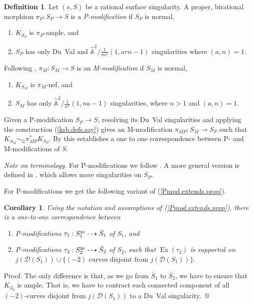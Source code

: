 \documentclass{amsart}
\newtheorem{cor}[thm]{Corollary}
\theoremstyle{definition}
\newtheorem{defn}[thm]{Definition}
\theoremstyle{remark}
\renewcommand{\a}[0]{\hat{\mathbb A}}
\newcommand{\q}[0]{{\mathbb Q}}
\newcommand{\map}[0]{\dasharrow}
\newcommand{\ex}[0]{\operatorname{Ex}}
\newcommand{\simq}[0]{\sim_{\q}}
\begin{document}
\begin{defn}\label{P+M.defn}
  Let $(s,S)$ be a rational surface singularity. A proper, birational morphism $\pi_P:S_P\to S$ is a {\it P-modification}
if $S_P$ is normal,
\begin{enumerate}
\item $K_{S_P}$ is $\pi_P$-ample, and
\item $S_P$ has only Du~Val and $\a^2/\tfrac1{rn^2}(1, arn{-}1)$ singularities where  $(a,n)=1$.
\end{enumerate}
Following  \cite{be-ch}, $\pi_M:S_M\to S$ is an
 {\it M-modification} if  $S_M$ is normal,
\begin{enumerate}
\item $K_{S_M}$ is $\pi_M$-nef, and
\item $S_M$ has only  $\a^2/\tfrac1{n^2}(1, na{-}1)$ singularities, where  $n>1$ and $(a,n)=1$.
\end{enumerate}
Given a P-modification  $S_P\to S$, resolving its Du~Val  singularities and applying the construction (\ref{ksb.defs.say}) 
gives an M-modification $\pi_{MP}:S_M\to S_P$ such that
$K_{S_M}\simq \pi_{MP}^*K_{S_P}$. By \cite{be-ch} this establishes a
one to one correspondence between P- and M-modifications of $S$.

{\it Note on terminology.} For P-modifications we follow \cite[3.8]{ksb}.
A more general version is defined in \cite[6.2.13]{k-etc}, which allows more  singularities on $S_P$.
\end{defn}

For P-modifications  we get the following variant of (\ref{Pmod.extends.prop}).



\begin{cor}\label{Pmod.extends.prop.cor} Using the notation and assumptions of (\ref{Pmod.extends.prop}), there is a one-to-one correspondence between
    \begin{enumerate}
      \item P-modifications $\tau_1: S_1^{\rm m}\map  \bar S_1$ of $S_1$, and
      \item P-modifications  $\tau_2: S_2^{\rm m}\map \bar S_2$ of $S_2$,  such that $\ex(\tau_2)$ is  supported on
        $j( {\mathcal D}(S_1))\cup\{(-2)\mbox{ curves disjoint from }j( {\mathcal D}(S_1))\} $.
    \end{enumerate}
\end{cor}

Proof. The only difference is that, as we go from $\bar S_1$ to $\bar S_2$, we have to ensure that $K_{\bar S_2}$ is ample. That is, we have to contract
each connected component of  all $(-2)$-curves disjoint from $j( {\mathcal D}(S_1))$ to  a Du~Val singularity. \qed
\end{document}
